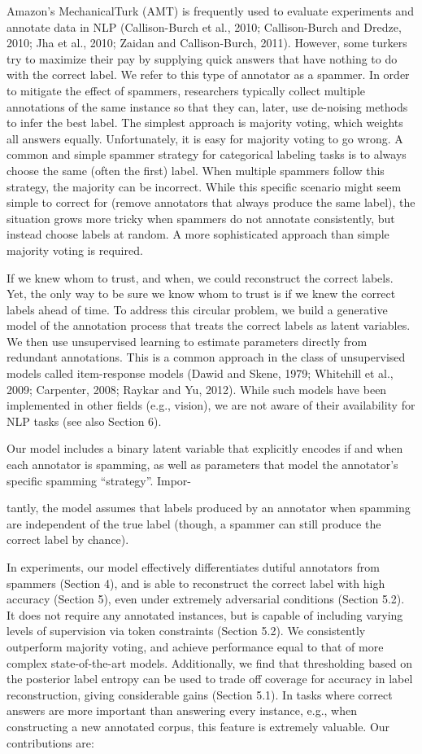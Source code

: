 \documentclass[
]{article}
\begin{document}
Amazon's MechanicalTurk (AMT) is frequently used to evaluate experiments
and annotate data in NLP (Callison-Burch et al., 2010; Callison-Burch
and Dredze, 2010; Jha et al., 2010; Zaidan and Callison-Burch, 2011).
However, some turkers try to maximize their pay by supplying quick
answers that have nothing to do with the correct label. We refer to this
type of annotator as a spammer. In order to mitigate the effect of
spammers, researchers typically collect multiple annotations of the same
instance so that they can, later, use de-noising methods to infer the
best label. The simplest approach is majority voting, which weights all
answers equally. Unfortunately, it is easy for majority voting to go
wrong. A common and simple spammer strategy for categorical labeling
tasks is to always choose the same (often the first) label. When
multiple spammers follow this strategy, the majority can be incorrect.
While this specific scenario might seem simple to correct for (remove
annotators that always produce the same label), the situation grows more
tricky when spammers do not annotate consistently, but instead choose
labels at random. A more sophisticated approach than simple majority
voting is required.

If we knew whom to trust, and when, we could reconstruct the correct
labels. Yet, the only way to be sure we know whom to trust is if we knew
the correct labels ahead of time. To address this circular problem, we
build a generative model of the annotation process that treats the
correct labels as latent variables. We then use unsupervised learning to
estimate parameters directly from redundant annotations. This is a
common approach in the class of unsupervised models called item-response
models (Dawid and Skene, 1979; Whitehill et al., 2009; Carpenter, 2008;
Raykar and Yu, 2012). While such models have been implemented in other
fields (e.g., vision), we are not aware of their availability for NLP
tasks (see also Section 6).

Our model includes a binary latent variable that explicitly encodes if
and when each annotator is spamming, as well as parameters that model
the annotator's specific spamming ``strategy''. Impor-

tantly, the model assumes that labels produced by an annotator when
spamming are independent of the true label (though, a spammer can still
produce the correct label by chance).

In experiments, our model effectively differentiates dutiful annotators
from spammers (Section 4), and is able to reconstruct the correct label
with high accuracy (Section 5), even under extremely adversarial
conditions (Section 5.2). It does not require any annotated instances,
but is capable of including varying levels of supervision via token
constraints (Section 5.2). We consistently outperform majority voting,
and achieve performance equal to that of more complex state-of-the-art
models. Additionally, we find that thresholding based on the posterior
label entropy can be used to trade off coverage for accuracy in label
reconstruction, giving considerable gains (Section 5.1). In tasks where
correct answers are more important than answering every instance, e.g.,
when constructing a new annotated corpus, this feature is extremely
valuable. Our contributions are:
\end{document}
